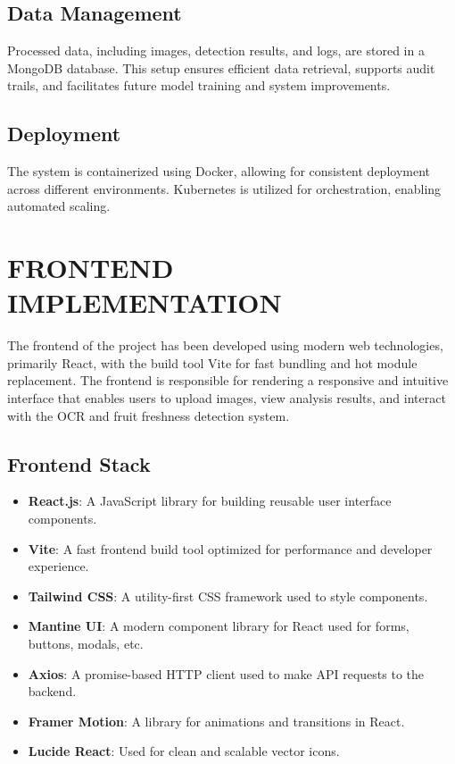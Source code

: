 \documentclass[12pt]{report}
\begin{document}
\subsection*{Data Management}
Processed data, including images, detection results, and logs, are stored in a MongoDB database. This setup ensures efficient data retrieval, supports audit trails, and facilitates future model training and system improvements.

\subsection*{Deployment}
The system is containerized using Docker, allowing for consistent deployment across different environments. Kubernetes is utilized for orchestration, enabling automated scaling.

\section{FRONTEND IMPLEMENTATION}

The frontend of the project has been developed using modern web technologies, primarily React, with the build tool Vite for fast bundling and hot module replacement. The frontend is responsible for rendering a responsive and intuitive interface that enables users to upload images, view analysis results, and interact with the OCR and fruit freshness detection system.

\subsection{Frontend Stack}

\begin{itemize}
    \item \textbf{React.js}: A JavaScript library for building reusable user interface components.
    \item \textbf{Vite}: A fast frontend build tool optimized for performance and developer experience.
    \item \textbf{Tailwind CSS}: A utility-first CSS framework used to style components.
    \item \textbf{Mantine UI}: A modern component library for React used for forms, buttons, modals, etc.
    \item \textbf{Axios}: A promise-based HTTP client used to make API requests to the backend.
    \item \textbf{Framer Motion}: A library for animations and transitions in React.
    \item \textbf{Lucide React}: Used for clean and scalable vector icons.
\end{itemize}
\end{document}
